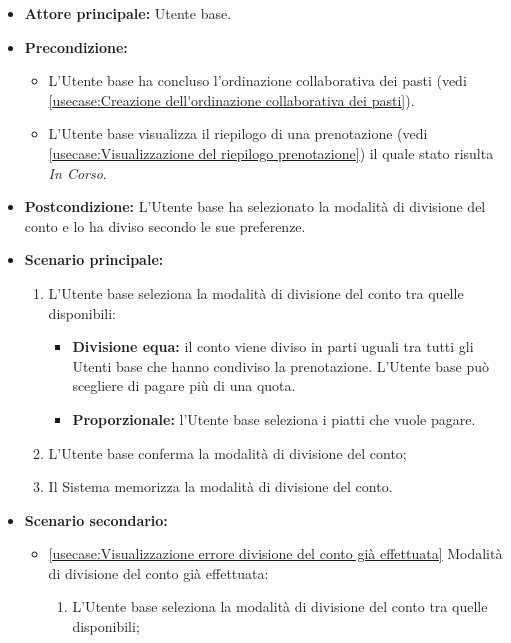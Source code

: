 \label{usecase:Selezione della modalità di divisione del conto}
\begin{itemize}
	\item \textbf{Attore principale:} Utente base.
	
	\item \textbf{Precondizione:}
	\begin{itemize}
		\item L'Utente base ha concluso l'ordinazione collaborativa dei pasti (vedi \autoref{usecase:Creazione dell'ordinazione collaborativa dei pasti}).
		\item L'Utente base visualizza il riepilogo di una prenotazione (vedi \autoref{usecase:Visualizzazione del riepilogo prenotazione}) il quale stato risulta \textit{In Corso}. 
	\end{itemize}

	\item \textbf{Postcondizione:}
	      L'Utente base ha selezionato la modalità di divisione del conto e lo ha diviso secondo le sue preferenze.
	\item \textbf{Scenario principale:}
	      \begin{enumerate}
		      \item L'Utente base seleziona la modalità di divisione del conto
		            tra quelle disponibili:
					\begin{itemize}
						\item \textbf{Divisione equa:} il conto viene diviso in parti
							  uguali tra tutti gli Utenti base che hanno condiviso la
							  prenotazione. L'Utente base può scegliere di pagare più di
							  una quota.
		  
						\item \textbf{Proporzionale:} l'Utente base seleziona i piatti che vuole
							  pagare.
					\end{itemize}

		      \item L'Utente base conferma la modalità di divisione del conto;

		      \item Il Sistema memorizza la modalità di divisione del conto.
	      \end{enumerate}

	\item \textbf{Scenario secondario:}
		  \begin{itemize}
			  \item \autoref{usecase:Visualizzazione errore divisione del conto già effettuata} Modalità di divisione del conto già effettuata:
				\begin{enumerate}
					\item L'Utente base seleziona la modalità di divisione del conto
						tra quelle disponibili;
	

\end{enumerate}
\end{itemize}
\end{itemize}
